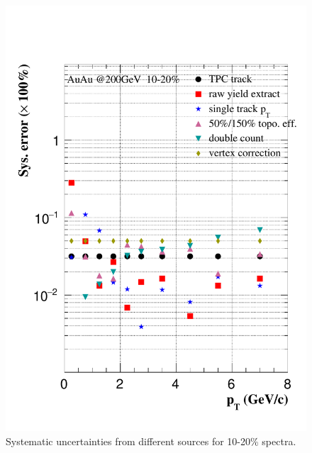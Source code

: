 \begin{figure}[htbp]
\begin{minipage}[htbp]{0.47\linewidth}
\includegraphics[width=1.0\textwidth,angle=0]{figure/Run14_D0HFT/sysErr_10_20_2.pdf} 
\caption{ Systematic uncertainties from different sources for 10-20\% spectra. \label{sysErr_10_20}}
\end{minipage}
\end{figure}

